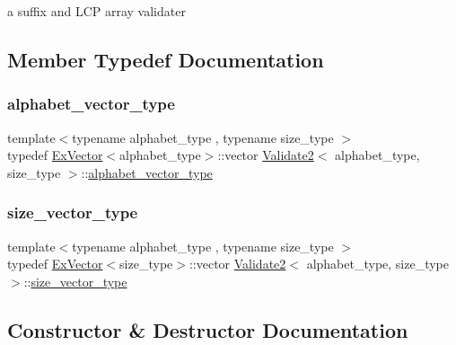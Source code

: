a suffix and L\+CP array validater 

\subsection{Member Typedef Documentation}
\mbox{\label{class_validate2_a351a2e7bbfdf9b87ecbb4f08cdbc1e64}} 
\subsubsection{\texorpdfstring{alphabet\+\_\+vector\+\_\+type}{alphabet\_vector\_type}}
{\footnotesize\ttfamily template$<$typename alphabet\+\_\+type , typename size\+\_\+type $>$ \\
typedef \hyperlink{struct_ex_vector}{Ex\+Vector}$<$alphabet\+\_\+type$>$\+::vector \hyperlink{class_validate2}{Validate2}$<$ alphabet\+\_\+type, size\+\_\+type $>$\+::\hyperlink{class_validate2_a351a2e7bbfdf9b87ecbb4f08cdbc1e64}{alphabet\+\_\+vector\+\_\+type}\hspace{0.3cm}{\ttfamily [private]}}

\mbox{\label{class_validate2_a8dab9b86f9c73419431821ebb68852c5}} 
\subsubsection{\texorpdfstring{size\+\_\+vector\+\_\+type}{size\_vector\_type}}
{\footnotesize\ttfamily template$<$typename alphabet\+\_\+type , typename size\+\_\+type $>$ \\
typedef \hyperlink{struct_ex_vector}{Ex\+Vector}$<$size\+\_\+type$>$\+::vector \hyperlink{class_validate2}{Validate2}$<$ alphabet\+\_\+type, size\+\_\+type $>$\+::\hyperlink{class_validate2_a8dab9b86f9c73419431821ebb68852c5}{size\+\_\+vector\+\_\+type}\hspace{0.3cm}{\ttfamily [private]}}



\subsection{Constructor \& Destructor Documentation}
\mbox{\label{class_validate2_a003e523f9fb81a2d6a465d6cec444c1f}} 
